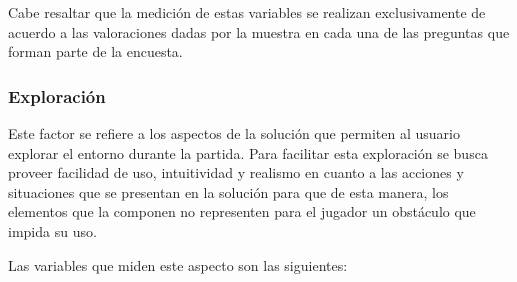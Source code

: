 Cabe resaltar que la medición de estas variables se realizan
exclusivamente de acuerdo a las valoraciones dadas por la muestra en cada una de
las preguntas que forman parte de la encuesta.

\subsubsection{Exploración}
\label{sec:sub_exploracion}
%

Este factor se refiere a los aspectos de la solución que permiten al usuario 
explorar el entorno durante la partida. Para facilitar esta exploración se 
busca proveer  facilidad de uso, intuitividad y realismo en cuanto a las acciones y
situaciones que se presentan en la solución para que de esta manera, los
elementos que la componen no representen para el jugador un obstáculo que impida
su uso.


Las variables que miden este aspecto son las siguientes:

